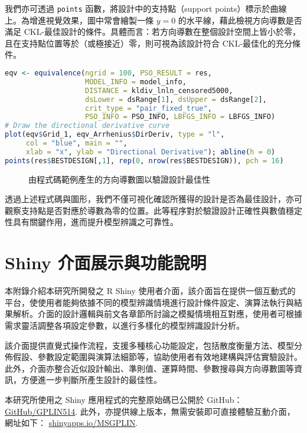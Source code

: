 我們亦可透過 \verb|points| 函數，將設計中的支持點（support points）標示於曲線上。為增進視覺效果，圖中常會繪製一條 $y = 0$ 的水平線，藉此檢視方向導數是否滿足 CKL-最佳設計的條件。具體而言：若方向導數在整個設計空間上皆小於零，且在支持點位置等於（或極接近）零，則可視為該設計符合 CKL-最佳化的充分條件。

\begin{lstlisting}[language=R, caption={等價定理與圖形驗證最佳性}]
eqv <- equivalence(ngrid = 100, PSO_RESULT = res,
                   MODEL_INFO = model_info,
                   DISTANCE = kldiv_lnln_censored5000,
                   dsLower = dsRange[1], dsUpper = dsRange[2],
                   crit_type = "pair_fixed_true",
                   PSO_INFO = PSO_INFO, LBFGS_INFO = LBFGS_INFO)
# Draw the directional derivative curve
plot(eqv$Grid_1, eqv_Arrhenius$DirDeriv, type = "l",
     col = "blue", main = "",
     xlab = "x", ylab = "Directional Derivative"); abline(h = 0)
points(res$BESTDESIGN[,1], rep(0, nrow(res$BESTDESIGN)), pch = 16)
\end{lstlisting}

\begin{figure}[H]
    \caption{由程式碼範例產生的方向導數圖以驗證設計最佳性}
\end{figure}

透過上述程式碼與圖形，我們不僅可視化確認所獲得的設計是否為最佳設計，亦可觀察支持點是否對應於導數為零的位置。此等程序對於驗證設計正確性與數值穩定性具有關鍵作用，進而提升模型辨識之可靠性。

\chapter{Shiny 介面展示與功能說明}\label{appendixC}

本附錄介紹本研究所開發之 R Shiny 使用者介面，該介面旨在提供一個互動式的平台，使使用者能夠依據不同的模型辨識情境進行設計條件設定、演算法執行與結果解析。介面的設計邏輯與前文各章節所討論之模擬情境相互對應，使用者可根據需求靈活調整各項設定參數，以進行多樣化的模型辨識設計分析。

該介面提供直覺式操作流程，支援多種核心功能設定，包括散度衡量方法、模型分佈假設、參數設定範圍與演算法細節等，協助使用者有效地建構與評估實驗設計。此外，介面亦整合近似設計輸出、準則值、運算時間、參數搜尋與方向導數圖等資訊，方便進一步判斷所產生設計的最佳性。

本研究所使用之 Shiny 應用程式的完整原始碼已公開於 GitHub：
\href{https://github.com/GPLIN514/Master-Thesis-ALT-Model-Discrimination-Design/tree/main/Thesis-code/shiny-demo}{GitHub/GPLIN514}.
此外，亦提供線上版本，無需安裝即可直接體驗互動介面，網址如下：
\href{https://msgplin.shinyapps.io/Model-Discrimination-Design/}{shinyapps.io/MSGPLIN}.

